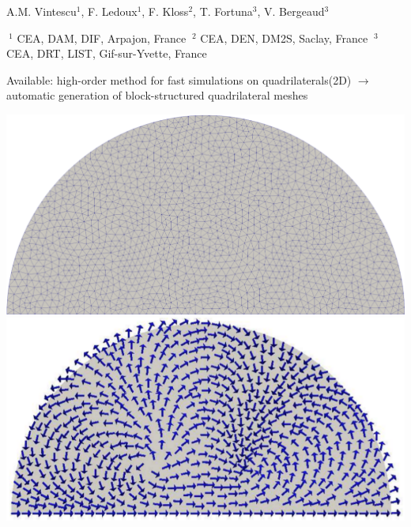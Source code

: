 \documentclass[8pt]{beamer}
\begin{document}
{\begin{minipage}[!T]{0.84\linewidth}
\begin{minipage}[!T]{0.99\linewidth}
\begin{center}
\end{center}
\end{minipage}
\newline
\begin{minipage}[!T]{0.99\linewidth}
\begin{center}
\scriptsize A.M. Vintescu$^{1}$, 
\scriptsize F. Ledoux$^{1}$,     
\scriptsize F. Kloss$^{2}$,
\scriptsize T. Fortuna$^{3}$,
\scriptsize V. Bergeaud$^{3}$\\
\end{center}
\end{minipage}
\newline
\begin{minipage}[!T]{0.99\linewidth}
\begin{center}
\tiny  $~^1$ CEA, DAM, DIF, Arpajon, France \hspace{2em}  
\tiny $~^2$ CEA, DEN, DM2S, Saclay, France \hspace{2em}  
\tiny $~^3$ CEA, DRT, LIST, Gif-sur-Yvette, France \hspace{2em}
\vspace{-0.3cm}
\end{center}
\end{minipage}
\end{minipage}
\vspace{-0.1cm}
\begin{center}
\small Available: high-order method for fast simulations on quadrilaterals(2D)
\newline
\small $\rightarrow$ automatic generation of block-structured quadrilateral meshes
\newline
\vspace{-0.1cm}
\end{center}
\vspace{-0.1cm}
\captionsetup{labelformat=empty}
\vspace{-0.1cm}
\noindent
\includegraphics[width=0.24\linewidth]{1}
\includegraphics[width=0.24\linewidth]{2}
}
\end{document}
